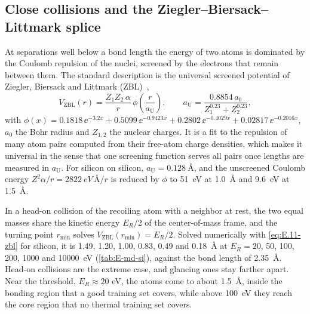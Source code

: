 \subsection{Close collisions and the Ziegler--Biersack--Littmark splice}

At separations well below a bond length the energy of two atoms is dominated by the Coulomb repulsion of the nuclei, screened by the electrons that remain between them. The standard description is the universal screened potential of Ziegler, Biersack and Littmark (ZBL)~\cite[Chap.~2]{ziegler1985stopping},
\begin{equation}
  V_{\mathrm{ZBL}}(r) = \frac{Z_1 Z_2\,\alpha}{r}\,\phi\!\left(\frac{r}{a_{\mathrm{U}}}\right), \qquad
  a_{\mathrm{U}} = \frac{0.8854\,a_0}{Z_1^{0.23} + Z_2^{0.23}},
  \label{eq:E.11-zbl}
\end{equation}
with $\phi(x) = 0.1818\,\ee^{-3.2x} + 0.5099\,\ee^{-0.9423x} + 0.2802\,\ee^{-0.4029x} + 0.02817\,\ee^{-0.2016x}$, $a_0$ the Bohr radius and $Z_{1,2}$ the nuclear charges. It is a fit to the repulsion of many atom pairs computed from their free-atom charge densities, which makes it universal in the sense that one screening function serves all pairs once lengths are measured in $a_{\mathrm{U}}$. For silicon on silicon, $a_{\mathrm{U}} = \SI{0.128}{\angstrom}$, and the unscreened Coulomb energy $Z^2\alpha/r = \SI{2822}{eV\,\angstrom}/r$ is reduced by $\phi$ to \SI{51}{eV} at \SI{1.0}{\angstrom} and \SI{9.6}{eV} at \SI{1.5}{\angstrom}.

In a head-on collision of the recoiling atom with a neighbor at rest, the two equal masses share the kinetic energy $E_R/2$ of the center-of-mass frame, and the turning point $r_{\mathrm{min}}$ solves $V_{\mathrm{ZBL}}(r_{\mathrm{min}}) = E_R/2$. Solved numerically with \cref{eq:E.11-zbl} for silicon, it is 1.49, 1.20, 1.00, 0.83, 0.49 and \SI{0.18}{\angstrom} at $E_R = 20$, 50, 100, 200, 1000 and \SI{10000}{eV} (\cref{tab:E-md-si}), against the bond length of \SI{2.35}{\angstrom}. Head-on collisions are the extreme case, and glancing ones stay farther apart. Near the threshold, $E_R \approx 20$ eV, the atoms come to about \SI{1.5}{\angstrom}, inside the bonding region that a good training set covers, while above \SI{100}{eV} they reach the core region that no thermal training set covers.

